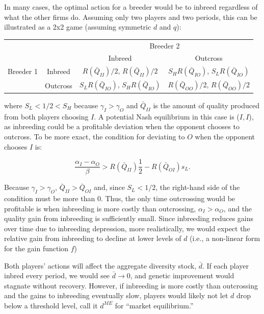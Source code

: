 \documentclass[12pt,letterpaper]{article}
\begin{document}
In many cases, the optimal action for a breeder would be to inbreed regardless of what the other firms do.
Assuming only two players and two periods, this can be illustrated as a 2x2 game (assuming symmetric $d$ and $q$):
\begin{center}
\begin{tabular}{cc|cc}
& & \multicolumn{2}{c}{Breeder 2}\\
& & Inbreed & Outcross \\ \hline
Breeder 1 & Inbreed & $R(\bar{Q}_{II})/2$, $R(\bar{Q}_{II})/2$ & $S_H R(\bar{Q}_{IO})$, $S_L R(\bar{Q}_{IO})$ \\
          & Outcross & $S_L R(\bar{Q}_{IO})$, $S_H R(\bar{Q}_{IO})$ & $R(\bar{Q}_{OO})/2$, $R(\bar{Q}_{OO})/2$ \\
\end{tabular}
\end{center} 
\vspace{.5cm}

where $S_L<1/2<S_H$ because $\gamma_I>\gamma_O$ and $\bar{Q}_{II}$ is the amount of quality produced from both players choosing $I$. A potential Nash equilibrium in this case is ($I, I$), as inbreeding could be a profitable deviation when the opponent chooses to outcross. To be more exact, the condition for deviating to $O$ when the opponent chooses $I$ is:

$$\frac{\alpha_I - \alpha_O}{\beta} > R(\bar{Q}_{II})\frac{1}{2} - R(\bar{Q}_{OI})s_L.$$
 
Because $\gamma_I>\gamma_O$, $\bar{Q}_{II}>\bar{Q}_{OI}$ and, since $S_L<1/2$, the right-hand side of the condition must be more than 0. Thus, the only time outcrossing would be profitable is when inbreeding is more costly than outcrossing, $\alpha_I>\alpha_O$, and the quality gain from inbreeding is sufficiently small. Since inbreeding reduces gains over time due to inbreeding depression, more realistically, we would expect the relative gain from inbreeding to decline at lower levels of $d$ (i.e., a non-linear form for the gain function $f$) 

Both players' actions will affect the aggregate diversity stock, $\bar{d}$.
If each player inbred every period, we would see $\bar{d} \rightarrow 0$, and genetic improvement would stagnate without recovery.
However, if inbreeding is more costly than outcrossing and the gains to inbreeding eventually slow, players would likely not let $d$ drop below a threshold level, call it $d^{ME}$ for ``market equilibrium.''
\end{document}
